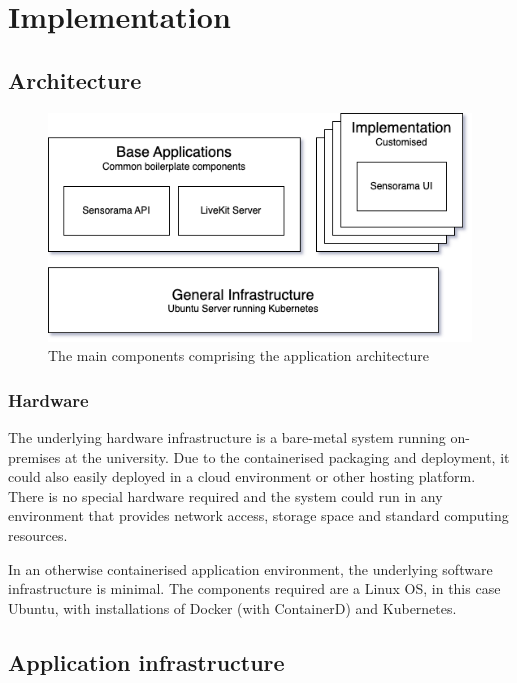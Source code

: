 \chapter{Implementation}

\section{Architecture}

\begin{figure}[h]
\centering
\includegraphics[scale=0.5]{04_Artefakte/01_Abbildungen/sensorama-stack}
\caption[{Sensorama Stack Diagram}]{The main components comprising the application architecture\protect}
\label{fig:sensoramaStack}
\end{figure}

\subsection{Hardware}

The underlying hardware infrastructure is a bare-metal system running on-premises at the university. Due to the containerised packaging and deployment, it could also easily deployed in a cloud environment or other hosting platform. There is no special hardware required and the system could run in any environment that provides network access, storage space and standard computing resources.

In an otherwise containerised application environment, the underlying software infrastructure is minimal. The components required are a Linux \ac{OS}, in this case Ubuntu, with installations of Docker (with ContainerD) and Kubernetes.


\section{Application infrastructure}

